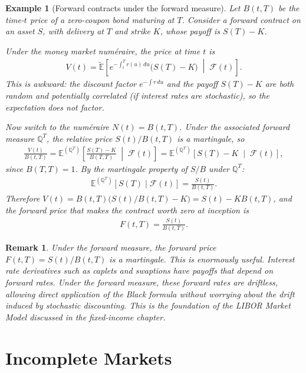 \documentclass{report}
\theoremstyle{spacedplain}
\theoremstyle{spaceddefinition}
\newtheorem{example}[theorem]{Example}
\theoremstyle{spacedremark}
\newtheorem{remark}[theorem]{Remark}
\begin{document}
\begin{example}[Forward contracts under the forward measure]
Let $B(t,T)$ be the time-$t$ price of a zero-coupon bond maturing at $T$. Consider a forward contract on an asset $S$, with delivery at $T$ and strike $K$, whose payoff is $S(T) - K$.

Under the money market num\'eraire, the price at time $t$ is
\begin{align}
    V(t) = \widetilde{\mathbb{E}}\!\left[e^{-\int_t^T r(u)\,du}\bigl(S(T) - K\bigr)\;\middle|\;\mathcal{F}(t)\right].
\end{align}
This is awkward: the discount factor $e^{-\int r\,du}$ and the payoff $S(T) - K$ are both random and potentially correlated (if interest rates are stochastic), so the expectation does not factor.

Now switch to the num\'eraire $N(t) = B(t,T)$. Under the associated forward measure $\mathbb{Q}^T$, the relative price $S(t)/B(t,T)$ is a martingale, so
\begin{align}
    \frac{V(t)}{B(t,T)} = \mathbb{E}^{(\mathbb{Q}^T)}\!\left[\frac{S(T) - K}{B(T,T)}\;\middle|\;\mathcal{F}(t)\right] = \mathbb{E}^{(\mathbb{Q}^T)}\!\left[S(T) - K\;\middle|\;\mathcal{F}(t)\right],
\end{align}
since $B(T,T) = 1$. By the martingale property of $S/B$ under $\mathbb{Q}^T$:
\begin{align}
    \mathbb{E}^{(\mathbb{Q}^T)}[S(T) \mid \mathcal{F}(t)] = \frac{S(t)}{B(t,T)}.
\end{align}
Therefore $V(t) = B(t,T)\bigl(S(t)/B(t,T) - K\bigr) = S(t) - KB(t,T)$, and the forward price that makes the contract worth zero at inception is
\begin{align}
    F(t,T) = \frac{S(t)}{B(t,T)}.
\end{align}
\end{example}

\begin{remark}
Under the forward measure, the forward price $F(t,T) = S(t)/B(t,T)$ is a martingale. This is enormously useful. Interest rate derivatives such as caplets and swaptions have payoffs that depend on forward rates. Under the forward measure, these forward rates are driftless, allowing direct application of the Black formula without worrying about the drift induced by stochastic discounting. This is the foundation of the LIBOR Market Model discussed in the fixed-income chapter.
\end{remark}

\section{Incomplete Markets}\label{sec:incomplete-markets}
 
\end{document}
